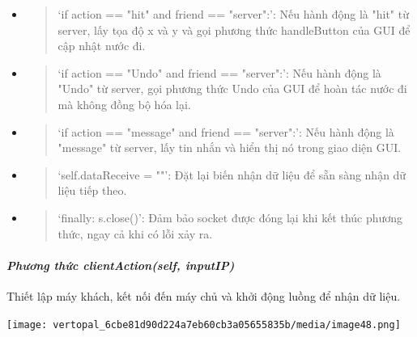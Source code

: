 \documentclass[a4paper]{article}
\begin{document}
\begin{itemize}
\item
  \begin{quote}
  `if action == "hit" and friend == "server"\textquotesingle:': Nếu hành
  động là "hit" từ server, lấy tọa độ x và y và gọi phương thức
  handleButton của GUI để cập nhật nước đi.
  \end{quote}
\item
  \begin{quote}
  `if action == "Undo" and friend == "server":': Nếu hành động là "Undo"
  từ server, gọi phương thức Undo của GUI để hoàn tác nước đi mà không
  đồng bộ hóa lại.
  \end{quote}
\item
  \begin{quote}
  `if action == "message" and friend == "server":': Nếu hành động là
  "message" từ server, lấy tin nhắn và hiển thị nó trong giao diện GUI.
  \end{quote}
\end{itemize}

\begin{itemize}
\item
  \begin{quote}
  `self.dataReceive = ""': Đặt lại biến nhận dữ liệu để sẵn sàng nhận dữ
  liệu tiếp theo.
  \end{quote}
\item
  \begin{quote}
  `finally: s.close()': Đảm bảo socket được đóng lại khi kết thúc phương
  thức, ngay cả khi có lỗi xảy ra.
  \end{quote}
\end{itemize}

\hypertarget{phux1b0ux1a1ng-thux1ee9c-clientactionself-inputip}{%
\paragraph{\texorpdfstring{\emph{Phương thức clientAction(self,
inputIP)}}{Phương thức clientAction(self, inputIP)}}\label{phux1b0ux1a1ng-thux1ee9c-clientactionself-inputip}}

Thiết lập máy khách, kết nối đến máy chủ và khởi động luồng để nhận dữ
liệu.

\texttt{[image: vertopal\_6cbe81d90d224a7eb60cb3a05655835b/media/image48.png]}
\end{document}
